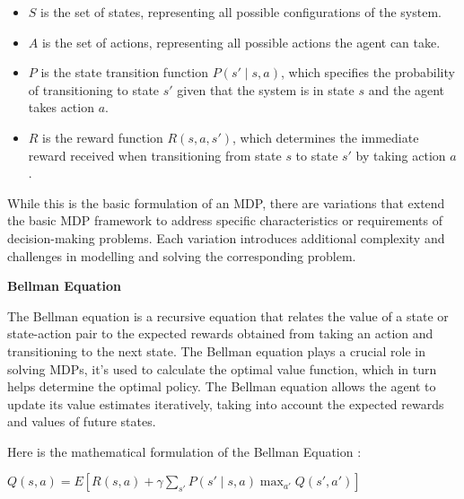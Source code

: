 \begin{itemize}

\item {\bf $S$ } is the set of states, representing all possible configurations of the system.
\item {\bf $A$ } is the set of actions, representing all possible actions the agent can take.
\item {\bf $P$ } is the state transition function $P(s' \mid s, a)$, which specifies the probability of transitioning to state $s'$ given that the system is in state $s$ and the agent takes action $a$.
\item {\bf $R$ } is the reward function $R(s, a, s')$, which determines the immediate reward received when transitioning from state $s$ to state $s'$ by taking action $a$.

\end{itemize}

\begin{textblock}
While this is the basic formulation of an MDP, there are variations that extend the basic MDP framework to address specific characteristics or requirements of decision-making problems. Each variation introduces additional complexity and challenges in modelling and solving the corresponding problem.
\end{textblock}


\begin{textblock}
{\bf Bellman Equation }

The Bellman equation is a recursive equation that relates the value of a state or state-action pair to the expected rewards obtained from taking an action and transitioning to the next state. 
The Bellman equation plays a crucial role in solving MDPs, it's used to calculate the optimal value function, which in turn helps determine the optimal policy. The Bellman equation allows the agent to update its value estimates iteratively, taking into account the expected rewards and values of future states.

Here is the mathematical formulation of the Bellman Equation \cite{suttonandbarto2018}\cite{aima2022}:
\end{textblock}

\begin{center}
{\bf\large
$ Q(s, a) = E[R(s, a) + \gamma \sum_{s'} P(s' \mid s, a) \max_{a'} Q(s', a')]$
}
\end{center}
    

